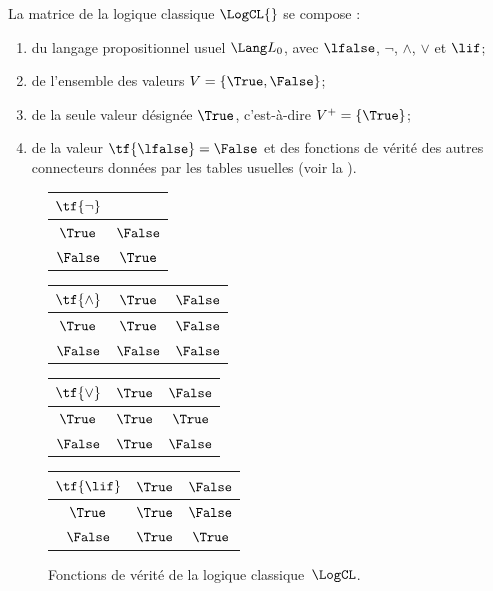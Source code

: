 \documentclass[../../../include/open-logic-section]{subfiles}
\begin{document}
\begin{ex}
La matrice de la logique classique
$\LogCL{}$ se compose :
\begin{enumerate}
\item du langage propositionnel usuel
  $\Lang L_0$, avec $\lfalse$,
  $\lnot$, $\land$, $\lor$ et $\lif$;
\item de l'ensemble des valeurs
  $V=\{\True,\False\}$;
\item de la seule valeur désignée
  $\True$, c'est-à-dire
  $V^+=\{\True\}$;
\item de la valeur
  $\tf{\lfalse}=\False$ et des
  fonctions de vérité des autres
  connecteurs données par les tables
  usuelles (voir la ).
\end{enumerate}
\begin{figure}
  \begin{center}
      \begin{tabular}{c|c}
        $\tf{\lnot}$ & \\
        \hline
        $\True$ & $\False$ \\
        $\False$ & $\True$
      \end{tabular}
      \quad
      \begin{tabular}{c|cc}
        $\tf{\land}$ & $\True$ & $\False$ \\
        \hline
        $\True$ & $\True$ & $\False$ \\
        $\False$ & $\False$ & $\False$
      \end{tabular}
      \quad
      \begin{tabular}{c|cc}
        $\tf{\lor}$ & $\True$ & $\False$ \\
        \hline
        $\True$ & $\True$ & $\True$ \\
        $\False$ & $\True$ & $\False$
      \end{tabular}
      \quad
      \begin{tabular}{c|cc}
        $\tf{\lif}$ & $\True$ & $\False$ \\
        \hline
        $\True$ & $\True$ & $\False$ \\
        $\False$ & $\True$ & $\True$
      \end{tabular}
    \end{center}
    \caption{Fonctions de vérité de la logique
      classique~$\LogCL$.}
  \end{figure}
\end{ex}
\end{document}
